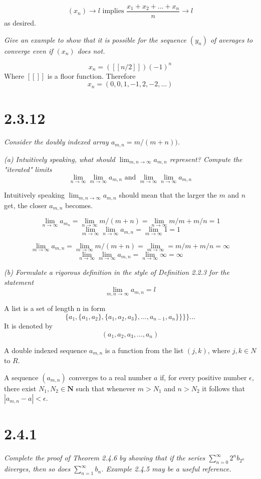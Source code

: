 \documentclass[11pt,oneside,titlepage]{article}
\begin{document}
$$(x_n) \to l \text{ implies } \frac{x_1 + x_2 + ... + x_n}{n} \to l$$
as desired.

\textit{Give an example to show that it is possible for the sequence $(y_n)$
  of averages to converge even if $(x_n)$ does not.}

$$x_n = ([[n / 2]])(-1)^n$$
Where $[[]]$ is a floor function.
Therefore
$$x_n = (0, 0, 1, -1, 2, -2, ...)$$


\section*{2.3.12}
\textit{Consider the doubly indexed array $a_{m,n} = m / (m + n))$.}

\textit{(a) Intuitively speaking, what should $\lim_{m,n \to \infty} a_{m,n}$
  represent? Compute the "iterated" limits}
$$ \lim_{n \to \infty} \lim_{m \to \infty} a_{m,n} \text{ and }
\lim_{m \to \infty} \lim_{n \to \infty} a_{m,n} $$

Intuitively speaking $\lim_{m,n \to \infty} a_{m,n}$ should mean that
the larger the $m$ and $n$ get, the closer $a_{m,n}$ becomes.

$$\lim_{n \to \infty} a_{m_n} = \lim_{n \to \infty} m/(m + n) =
\lim_{n \to \infty} m/m + m/n = 1$$  
$$\lim_{m \to \infty} \lim_{n \to \infty} a_{m,n} =
\lim_{m \to \infty}  1 = 1$$

$$\lim_{m \to \infty} a_{m,n} = \lim_{m \to \infty} m/(m + n) =
\lim_{m \to \infty} = m/m + m/n = \infty$$
$$\lim_{n \to \infty} \lim_{m \to \infty} a_{m,n} = \lim_{n \to \infty} \infty = \infty$$

\textit{(b) Formulate a rigorous definition in the style of Definition 2.2.3
  for the statement}
$$\lim_{m,n \to \infty} a_{m,n} = l$$

A list is a set of length n in form
$$\{a_1, \{a_1, a_2\}, \{a_1, a_2, a_3\}, ..., a_{n -1}, a_n\}\}\}\}... $$
It is denoted by
$$(a_1, a_2, a_3, ..., a_n)$$

A double indexed sequence $a_{m,n}$ is a function from the list $(j, k)$,
where $j, k \in N$ to $R$.

A sequence $(a_{m, n})$ converges to a real number $a$ if, for every positive
number $\epsilon$, there exist $N_1, N_2 \in \textbf{N}$ such that
whenever $m > N_1$ and $n > N_2$ it follows that $|a_{m,n} - a| <
\epsilon$.

\section*{2.4.1}
\textit{Complete the proof of Theorem 2.4.6 by showing that if the
  series $\sum^{\infty}_{n = 0} 2^n b_{2^n}$ diverges, then so does
  $\sum^{\infty}_{n = 1} b_n$. Example 2.4.5 may be a useful reference.}
\end{document}
